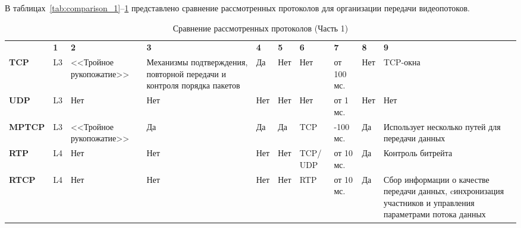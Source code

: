В таблицах~\ref{tab:comparison_1}--\ref{tab:comparison_2} представлено сравнение рассмотренных протоколов для организации передачи видеопотоков.

\clearpage

\begin{table}
	\centering
	\begin{threeparttable}
		\caption{\label{tab:comparison_2} Сравнение рассмотренных протоколов (Часть 1)}
		\begin{tabular}{|>{\centering\arraybackslash}p{2.5cm}|>{\centering\arraybackslash}p{1cm}|>{\centering\arraybackslash}p{2.5cm}|>{\centering\arraybackslash}p{3.5cm}|>{\centering\arraybackslash}p{1cm}|>{\centering\arraybackslash}p{1cm}|>{\centering\arraybackslash}p{1.5cm}|>{\centering\arraybackslash}p{2.5cm}|>{\centering\arraybackslash}p{1cm}|>{\centering\arraybackslash}p{5cm}|}
			\hline
			\multirow{2}{*}{\textbf{Протокол}} & \multicolumn{9}{c|}{\textbf{Номер критерия}} \\ \cline{2-10}
			& \textbf{1}   & \textbf{2} 	   & \textbf{3} & \textbf{4} & \textbf{5} & \textbf{6} & \textbf{7} & \textbf{8} & \textbf{9} \\ \hline
			\textbf{TCP}       & L3  & <<Тройное рукопожатие>> & Механизмы подтверждения, повторной передачи и контроля порядка пакетов & Да & Нет & Нет & от 100 мс. & Нет & TCP-окна \\ \hline
			\textbf{UDP}  	   & L3  & Нет					   & Нет & Нет & Нет & Нет      & от 1 мс. & Нет & Нет \\ \hline
			\textbf{MPTCP}     & L3  & <<Тройное рукопожатие>> & Да  & Да  & Да  & TCP      & 30-100 мс. & Да & Использует несколько путей для передачи данных \\ \hline
			\textbf{RTP}  	   & L4  & Нет                     & Нет & Нет & Нет & TCP/ UDP & от 10 мс. & Да & Контроль битрейта \\ \hline
			\textbf{RTCP}      & L4  & Нет                     & Нет & Нет & Нет & RTP & от 10 мс. & Да & Сбор информации о качестве передачи данных, cинхронизация участников и управления параметрами потока данных \\ \hline

			
		\end{tabular}
	\end{threeparttable}
\end{table}

\clearpage


